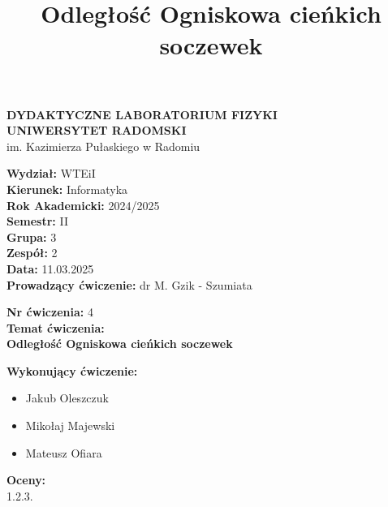 \documentclass[12pt]{article}
\title{Odległość Ogniskowa cieńkich soczewek}
\date{}
\begin{document}
\begin{titlepage}
    \centering
    \Large
    \textbf{DYDAKTYCZNE LABORATORIUM FIZYKI} \\
    \vspace{0.2cm}
    \textbf{UNIWERSYTET RADOMSKI}\\
    im. Kazimierza Pułaskiego w Radomiu \\
    
    \vspace{1.5cm}
    \begin{flushleft}
        \textbf{Wydział:} {WTEiI} \\
        \textbf{Kierunek:} Informatyka \\
        \textbf{Rok Akademicki:} 2024/2025 \\
        \textbf{Semestr:} II \\
        \textbf{Grupa:} 3 \\
        \textbf{Zespół:} 2 \\
        \textbf{Data:} 11.03.2025 \\
        \textbf{Prowadzący ćwiczenie:} dr M. Gzik - Szumiata \\
    \end{flushleft}
    
    \vspace{1cm}
    \begin{flushleft}
        \textbf{Nr ćwiczenia:} 4 \\
        \textbf{Temat ćwiczenia:} \\
        \textbf{Odległość Ogniskowa cieńkich soczewek} \\
    \end{flushleft}
    
    \vspace{1cm}
    \begin{flushleft}
        \textbf{Wykonujący ćwiczenie:}
        \begin{itemize}
            \item Jakub Oleszczuk
            \item Mikołaj Majewski
            \item Mateusz Ofiara
        \end{itemize}
    \end{flushleft}

    \vfill
    \begin{flushleft}
        \textbf{Oceny:} \\
        1.\hspace{2cm}2.\hspace{2cm}3.
    \end{flushleft}
\end{titlepage}
\end{document}
